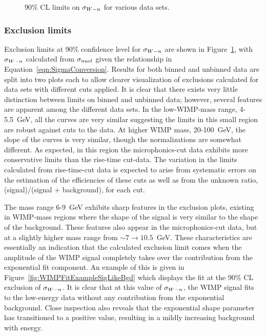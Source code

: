 			\begin{sidewaysfigure}
				\centering
				\caption[90\% CL limits on $\sigman$ for various data sets]
				{90\% CL limits on $\sigman$ for various data sets.}
				\label{fig:UnconstrainedLimits}
			\end{sidewaysfigure}			
			
			\subsubsection{Exclusion limits}	
Exclusion limits at 90\% confidence level for $\sigman$ are shown in Figure~\ref{fig:UnconstrainedLimits}, with $\sigman$ calculated from $\sigma_{nucl}$ given the relationship in Equation~\ref{eqn:SigmaConversion}.  Results for both binned and unbinned data are split into two plots each to allow clearer visualization of exclusions calculated for data sets with different cuts applied.  
It is clear that there exists very little distinction between limits on binned and unbinned data; however, several features are apparent among the different data sets.  In the low-WIMP-mass range, 4-5.5~GeV, all the curves are very similar suggesting the limits in this small region are robust against cuts to the data.  At higher WIMP mass, 20-100~GeV, the slope of the curves is very similar, though the normalizations are somewhat different.  As expected, in this region the microphonics-cut data exhibits more conservative limits than the rise-time cut-data.  The variation in the limits calculated from rise-time-cut data is expected to arise from systematic errors on the estimation of the efficiencies of these cuts as well as from the unknown ratio, (signal)/(signal + background), for each cut.  

The mass range 6-9~GeV exhibits sharp features in the exclusion plots, existing in WIMP-mass regions where the shape of the signal is very similar to the shape of the background.  These features also appear in the microphonics-cut data, but at a slightly higher mass range from $\sim7\to10.5$~GeV.  These characteristics are essentially an indication that the calculated exclusion limit comes when the amplitude of the WIMP signal completely takes over the contribution from the exponential fit component.  An example of this is given in Figure~\ref{fig:WIMPFitExampleSigLikeBgd} which displays the fit at the 90\% CL exclusion of $\sigman$.  It is clear that at this value of $\sigman$, the WIMP signal fits to the low-energy data without any contribution from the exponential background.  Close inspection also reveals that the exponential shape parameter has transitioned to a positive value, resulting in a mildly increasing background with energy.  

